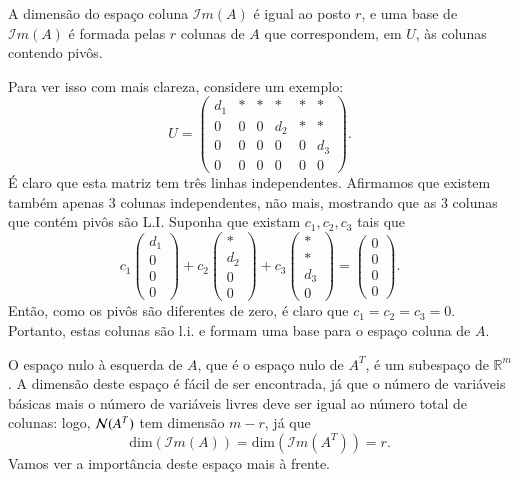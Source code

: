 A dimensão do espaço coluna ${\mathcal{I}}m(A)$ é igual ao posto $r$, e uma base de ${\mathcal{I}}m(A)$ é formada pelas $r$ colunas de $A$ que correspondem, em $U$, às colunas contendo pivôs.

Para ver isso com mais clareza, considere um exemplo:
\begin{equation*}
  U = 
  \begin{pmatrix}
      d_1 & *&*&*&*&*\\
      0 & 0 & 0 & d_2 & *&*\\
      0 & 0 & 0 & 0 & 0 & d_3\\
      0&0&0&0&0&0
    \end{pmatrix}.
\end{equation*}
É claro que esta matriz tem três linhas independentes. Afirmamos que existem também apenas 3 colunas independentes, não mais, mostrando que as 3 colunas que contém pivôs são L.I. Suponha que existam $c_1,c_2,c_3$ tais que
\begin{equation*}
  c_1
    \begin{pmatrix}
      d_1\\
      0\\
      0\\
      0
    \end{pmatrix}
    + c_2 
    \begin{pmatrix}
      *\\
      d_2\\
      0\\
      0
    \end{pmatrix}
    + c_3 
    \begin{pmatrix}
      *\\
      *\\
      d_3\\
      0
    \end{pmatrix}
    =
    \begin{pmatrix}
      0\\
      0\\
      0\\
      0
    \end{pmatrix}.
\end{equation*}
Então, como os pivôs são diferentes de zero, é claro que $c_1=c_2=c_3=0$. Portanto, estas colunas são l.i. e formam uma base para o espaço coluna de $A$.

O espaço nulo à esquerda de $A$, que é o espaço nulo de $A^T$, é um subespaço de ${\mathbb{R}}^m$. A dimensão deste espaço é fácil de ser encontrada, já que o número de variáveis básicas mais o número de variáveis livres deve ser igual ao número total de colunas: logo, ${\cal{N}}(A^T)$ tem dimensão $m-r$, já que 
\begin{equation*}
   \text{dim}({\mathcal{I}}m(A)) = \text{dim}({\mathcal{I}}m(A^T)) = r.
\end{equation*}
Vamos ver a importância deste espaço mais à frente.

